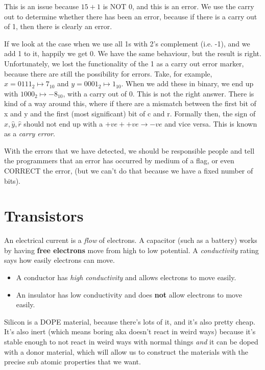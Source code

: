 \documentclass[11pt,a4paper,titlepage,dvipsnames,cmyk]{scrartcl}
\begin{document}
This is an issue because $15 + 1$ is NOT 0, and this is an error. We use the
carry out to determine whether there has been an error, because if there is a
carry out of 1, then there is clearly an error.

If we look at the case when we use all 1s with 2's complement (i.e. -1), and we
add 1 to it, happily we get 0. We have the same behaviour, but the result is
right. Unfortunately, we lost the functionality of the 1 as a carry out error
marker, because there are still the possibility for errors. Take, for example,
$x = 0111_2 \mapsto 7_{10}$ and $y = 0001_2 \mapsto 1_{10}$. When we add these in
binary, we end up with $1000_2 \mapsto -8_{10}$, with a carry out of 0. This is
not the right answer. There is kind of a way around this, where if there are a
mismatch between the first bit of x and y and the first (most significant) bit
of c and r. Formally then, the sign of $\hat x, \hat y, \hat r$ should not end
up with a $+ve + +ve \rightarrow -ve$ and vice versa. This is known as a
\textit{carry error}. 

With the errors that we have detected, we should be responsible people and tell
the programmers that an error has occurred by medium of a flag, or even CORRECT
the error, (but we can't do that because we have a fixed number of bits).

\section{Transistors}%
\label{sec:Transistors}

An electrical current is a \textit{flow} of electrons. A capacitor (such as a
battery) works by having \textbf{free electrons} move from high to low
potential. A \textit{conductivity} rating says how easily electrons can move.
\begin{itemize}
    \item A conductor has \textit{high conductivity} and allows electrons to
        move easily.
    \item An insulator has low conductivity and does \textbf{not} allow
        electrons to move easily.
\end{itemize}

Silicon is a DOPE material, because there's lots of it, and it's also pretty
cheap. It's also inert (which means boring aka doesn't react in weird ways)
because it's stable enough to not react in weird ways with normal things
\textit{and} it can be doped with a donor material, which will allow us to
construct the materials with the precise sub atomic properties that we want.
\end{document}
